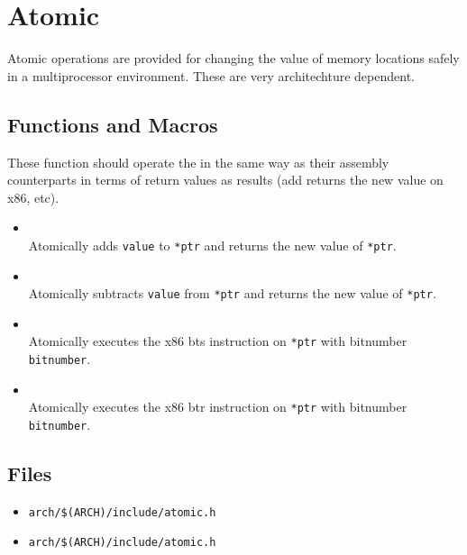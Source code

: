 \section{Atomic}
Atomic operations are provided for changing the value of memory locations
safely in a multiprocessor environment. These are very architechture dependent.

\subsection{Functions and Macros}
These function should operate the in the same way as their assembly counterparts
in terms of return values as results (add returns the new value on x86, etc).
\begin{itemize}
\item {} \\
Atomically adds \texttt{value} to \texttt{*ptr} and returns the new value of \texttt{*ptr}.
\item {} \\
Atomically subtracts \texttt{value} from \texttt{*ptr} and returns the new value of \texttt{*ptr}.
\item {} \\
Atomically executes the x86 bts instruction on \texttt{*ptr} with bitnumber \texttt{bitnumber}.
\item {} \\
Atomically executes the x86 btr instruction on \texttt{*ptr} with bitnumber \texttt{bitnumber}.
\end{itemize}

\subsection{Files}
\begin{itemize}
\item \texttt{arch/\$(ARCH)/include/atomic.h}
\item \texttt{arch/\$(ARCH)/include/atomic.h}
\end{itemize}
